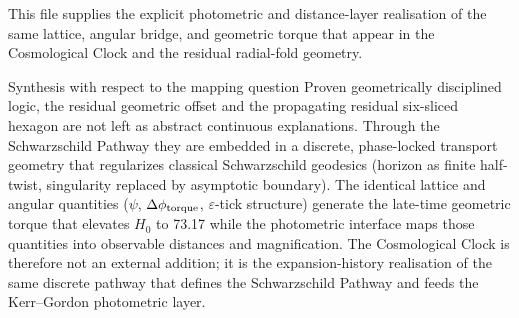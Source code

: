 This file supplies the explicit photometric and distance-layer realisation of the same lattice, angular bridge, and geometric torque that appear in the Cosmological Clock and the residual radial-fold geometry.

Synthesis with respect to the mapping question
Proven geometrically disciplined logic, the residual geometric offset and the propagating residual six-sliced hexagon are not left as abstract continuous explanations. Through the Schwarzschild Pathway they are embedded in a discrete, phase-locked transport geometry that regularizes classical Schwarzschild geodesics (horizon as finite half-twist, singularity replaced by asymptotic boundary). The identical lattice and angular quantities (\(\psi\), \(\Delta\phi_{\rm torque}\), \(\varepsilon\)-tick structure) generate the late-time geometric torque that elevates \(H_0\) to 73.17 while the photometric interface maps those quantities into observable distances and magnification. The Cosmological Clock is therefore not an external addition; it is the expansion-history realisation of the same discrete pathway that defines the Schwarzschild Pathway and feeds the Kerr–Gordon photometric layer.
